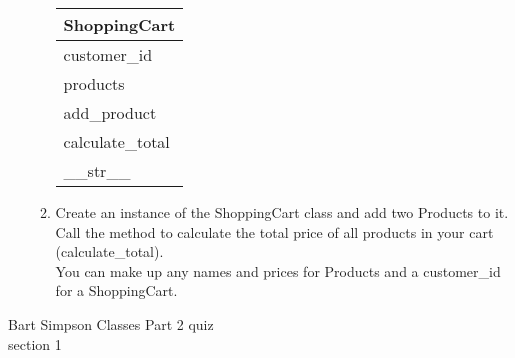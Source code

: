 \documentclass{article}
\begin{document}
\begin{enumerate}
\begin{enumerate}
			\begin{flushright}
			\begin{tabular}{|l|}
				\hline
				ShoppingCart\\ \hline  	%
				customer\_id \\ products\\ \hline		%
				add\_product \\ calculate\_total \\ \_\_str\_\_ \\ \hline		%
			\end{tabular}
			\end{flushright}

		\item
			Create an instance of the ShoppingCart class and add two Products to it.\\
			Call the method to calculate the total price of all products in your cart (calculate\_total).\\
			You can make up any names and prices for Products and a customer\_id for a ShoppingCart.\\
	\end{enumerate}
\pagebreak


\end{enumerate}
\pagebreak
Bart Simpson \hfill Classes Part 2 quiz\\
section 1\\
\end{document}
